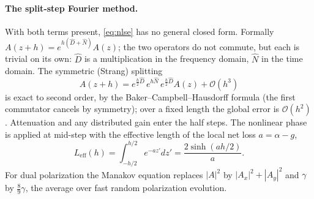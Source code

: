 \paragraph{The split-step Fourier method.} With both terms present, \cref{eq:nlse} has no
general closed form. Formally $A(z+h)=e^{h(\hat D+\hat N)}A(z)$; the two operators do not commute,
but each is trivial on its own: $\hat D$ is a multiplication in the frequency domain, $\hat N$ in
the time domain. The symmetric (Strang) splitting
\begin{equation}
  A(z+h)=e^{\frac h2\hat D}\,e^{h\hat N}\,e^{\frac h2\hat D}A(z)+\mathcal O(h^3)
  \label{eq:strang}
\end{equation}
is exact to second order, by the Baker--Campbell--Hausdorff formula (the first commutator cancels
by symmetry); over a fixed length the global error is $\mathcal O(h^2)$. Attenuation and any
distributed gain enter the half steps. The nonlinear phase is applied at mid-step with the
effective length of the local net loss $a=\alpha-g$,
\begin{equation}
  L_{\mathrm{eff}}(h)=\int_{-h/2}^{h/2}e^{-az'}dz'=\frac{2\sinh(ah/2)}{a} .
\end{equation}
For dual polarization the Manakov equation replaces $|A|^2$ by $|A_x|^2+|A_y|^2$ and $\gamma$ by
$\frac89\gamma$, the average over fast random polarization evolution.

